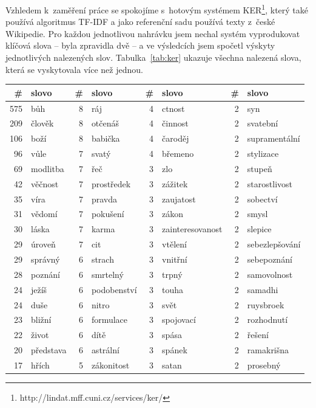 Vzhledem k~zaměření práce se spokojíme s~hotovým systémem
KER\footnote{http://lindat.mff.cuni.cz/services/ker/}, který také používá
algoritmus TF-IDF a jako referenční sadu používá texty z~české Wikipedie.
Pro každou jednotlivou nahrávku jsem nechal systém vyprodukovat klíčová slova --
byla zpravidla dvě -- a ve výsledcích jsem spočetl výskyty jednotlivých
nalezených slov.
Tabulka~\ref{tab:ker} ukazuje všechna nalezená slova, která se vyskytovala více
než jednou.

\begin{table}[htpb]
\begin{center}
\begin{tabular}{|r l|r l|r l|r l|}
\hline
\# & slovo & \# & slovo & \# & slovo & \# & slovo \\
\hline
575 & bůh	 & 8 & ráj	 & 4 & ctnost	 & 2 & syn	 \\
209 & člověk	 & 8 & otčenáš	 & 4 & činnost	 & 2 & svatební	 \\
106 & boží	 & 8 & babička	 & 4 & čaroděj	 & 2 & supramentální	 \\
96 & vůle	 & 7 & svatý	 & 4 & břemeno	 & 2 & stylizace	 \\
69 & modlitba	 & 7 & řeč	 & 3 & zlo	 & 2 & stupeň	 \\
42 & věčnost	 & 7 & prostředek	 & 3 & zážitek	 & 2 & starostlivost	 \\
35 & víra	 & 7 & pravda	 & 3 & zaujatost	 & 2 & sobectví	 \\
31 & vědomí	 & 7 & pokušení	 & 3 & zákon	 & 2 & smysl	 \\
30 & láska	 & 7 & karma	 & 3 & zainteresovanost & 2 & slepice	 \\
29 & úroveň	 & 7 & cit	 & 3 & vtělení	 & 2 & sebezlepšování	 \\
29 & správný	 & 6 & strach	 & 3 & vnitřní	 & 2 & sebepoznání	 \\
28 & poznání	 & 6 & smrtelný	 & 3 & trpný	 & 2 & samovolnost	 \\
24 & ježíš	 & 6 & podobenství	 & 3 & touha	 & 2 & samadhi	 \\
24 & duše	 & 6 & nitro	 & 3 & svět	 & 2 & ruysbroek	 \\
23 & bližní	 & 6 & formulace	 & 3 & spojovací	 & 2 & rozhodnutí	 \\
22 & život	 & 6 & dítě	 & 3 & spása	 & 2 & řešení	 \\
20 & představa	 & 6 & astrální	 & 3 & spánek	 & 2 & ramakrišna	 \\
17 & hřích	 & 5 & zákonitost	 & 3 & satan	 & 2 & prosebný	 \\

\end{tabular}
\end{center}
\end{table}
